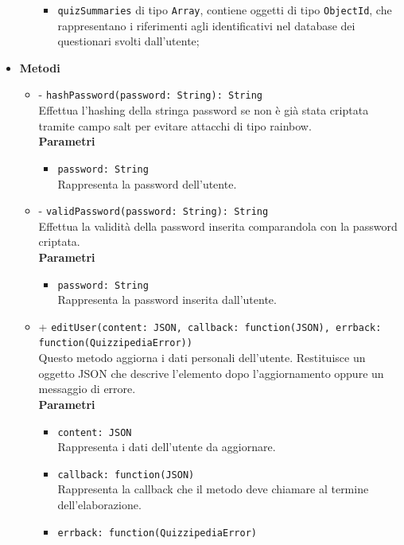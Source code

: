 \begin{itemize}
\begin{itemize}
\begin{itemize}
				\item
					\texttt{quizSummaries} di tipo \texttt{Array}, contiene oggetti di tipo \texttt{ObjectId}, che rappresentano i riferimenti agli identificativi nel database dei questionari svolti dall'utente;		
			\end{itemize}	
		\end{itemize}	
	\item \textbf{Metodi}
		\begin{itemize}
		\item
		- \texttt{hashPassword(password: String): String} \\
		Effettua l'hashing della stringa password se non è già stata criptata tramite campo salt per evitare attacchi di tipo rainbow. \\
		\textbf{Parametri} 
			\begin{itemize}
			\item
				 \texttt{password: String} \\
				Rappresenta la password dell'utente.
			\end{itemize}
		\item
		- \texttt{validPassword(password: String): String} \\
		Effettua la validità della password inserita comparandola con la password criptata.	\\
		\textbf{Parametri} 
			\begin{itemize}
			\item
				\texttt{password: String} \\
				Rappresenta la password inserita dall'utente.
			\end{itemize}
		\item
		+ \texttt{editUser(content: JSON, callback: function(JSON), errback: function(QuizzipediaError))} \\
		Questo metodo aggiorna i dati personali dell'utente. Restituisce un oggetto JSON che descrive l’elemento dopo l’aggiornamento oppure un messaggio di errore.	\\
		\textbf{Parametri} 
			\begin{itemize}
			\item
				\texttt{content: JSON} \\
				Rappresenta i dati dell'utente da aggiornare.
			\item	
				\texttt{callback: function(JSON)} \\
				Rappresenta la callback che il metodo deve chiamare al termine dell'elaborazione.
			\item	
				\texttt{errback: function(QuizzipediaError)} \\

\end{itemize}
\end{itemize}
\end{itemize}
